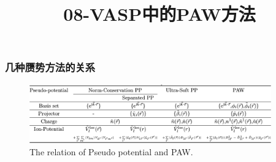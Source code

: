 {\frame
{
	\frametitle{几种赝势方法的关系}
\begin{figure}[h!]
\centering
\includegraphics[height=1.0in,width=4.1in,clip]{Figures/Pseudo-Potential.png}
\caption{\tiny \textrm{The relation of Pseudo potential and PAW.}}%
\label{Pseudo_Potential_PAW}
\end{figure}
}
\title{08-\rm{VASP}中的\rm{PAW}方法}
%

}
